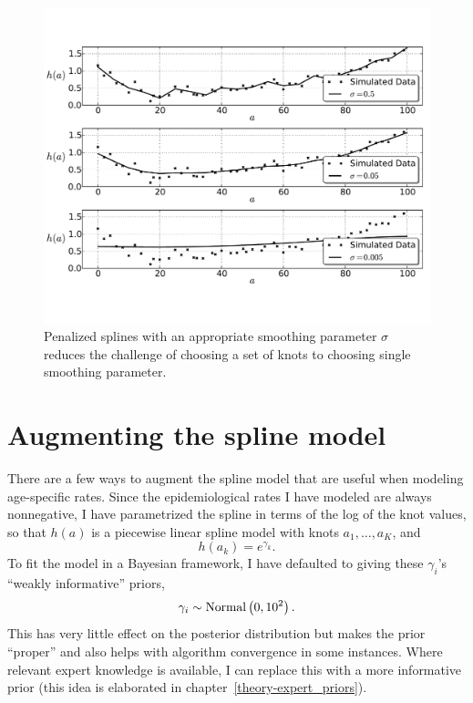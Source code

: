 \begin{figure}[h]
\begin{center}
\includegraphics[width=\textwidth]{smoothing-splines.pdf}
\caption[Penalized splines with a range of smoothing
  parameters.]{Penalized splines with an appropriate smoothing
  parameter $\sigma$ reduces the challenge of choosing a set of knots
  to choosing single smoothing parameter.}
\label{smoothing-splines}
\end{center}
\end{figure}


\section{Augmenting the spline model}
There are a few ways to augment the spline model that are useful when
modeling age-specific rates. Since the epidemiological rates I have modeled
are always nonnegative, I have parametrized the spline in
terms of the log of the knot values, so that $h(a)$ is a piecewise
linear spline model with knots $a_1,\ldots,a_K$, and
\[
h(a_k) = e^{\gamma_k}.
\]
To fit the model in a Bayesian framework, I have defaulted to
giving these $\gamma_i$'s ``weakly informative'' priors,
\[
\gamma_i \sim \operatorname{Normal}\left(0, 10^2\right).
\]
This has very little effect on the posterior distribution but makes
the prior ``proper'' and also helps with algorithm convergence in
some instances. Where relevant expert knowledge is
available, I can replace this with a more informative prior (this idea
is elaborated in chapter~\ref{theory-expert_priors}).

